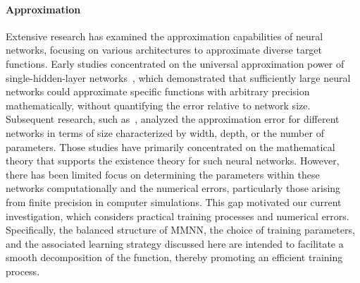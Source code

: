 \documentclass[review,hidelinks,onefignum,onetabnum]{siamart250211}
\begin{document}
\paragraph{Approximation}
Extensive research has examined the approximation capabilities of neural networks, focusing on various architectures to approximate diverse target functions. Early studies concentrated on the universal approximation power of single-hidden-layer networks~\cite{Cybenko1989ApproximationBS,HORNIK1991251,HORNIK1989359}, which demonstrated that sufficiently large neural networks could approximate specific functions with arbitrary precision mathematically, without quantifying the error relative to network size. Subsequent research, such as~\cite{yarotsky18a,yarotsky2017,doi:10.1137/18M118709X,ZHOU2019,10.3389/fams.2018.00014,2019arXiv190501208G,2019arXiv190207896G,MO,shijun:NonlineArpprox,shijun:Characterized:by:Numer:Neurons,shijun:smooth:functions,shijun:arbitrary:error:with:fixed:size,shijun:thesis,shijun:intrinsic:parameters,shijun:RCNet,JMLR:v25:23-0912,shijun:net:arc:beyond:width:depth,shijun:optimal:rate:in:width:and:depth}, analyzed the approximation error for different networks in terms of size characterized by width, depth, or the number of parameters. 
Those studies have primarily concentrated on the mathematical theory that supports the existence theory for such neural networks. However, there has been limited focus on determining the parameters within these networks computationally and the numerical errors, particularly those arising from finite precision in computer simulations. This gap motivated our current investigation, which considers practical training processes and numerical errors. Specifically, the balanced structure of MMNN, the choice of training parameters, and the associated learning strategy discussed here are intended to facilitate a smooth decomposition of the function, thereby promoting an efficient training process.
\end{document}
